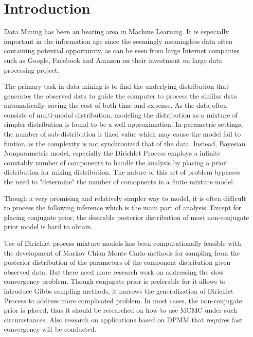 \section{Introduction}
\indent Data Mining has been an heating area in Machine Learning. It is especially important in the information age since the seemingly meaningless data often containing potential opportunity, as can be seen from large Internet companies such as Google, Facebook and Amazon \cite{mcafee2012big}on their investment on large data processing project. 

The primary task in data mining is to find the underlying distribution that generates the observed data to guide the computer to process the similar data automatically, saving the cost of both time and expense. As the data often consists of multi-modal distribution, modeling the distribution as a mixture of simpler distribution is found to be a well approximation. In parametric settings, the number of sub-distribution is fixed value which may cause the model fail to funtion as the complexity is not synchronized that of the data. Instead, Bayesian Nonparametric model, especially the Dirichlet Process employs a infinite countably number of components to handle the analysis by placing a prior distribution for mixing distribution. The nature of this set of problem bypasses the need to "determine" the number of comopnents in a finite mixture model. 

Though a very promising and relatively simpler way to model, it is often difficult to process the following inference which is the main part of analysis. Except for placing conjugate prior, the desirable posterior distribution of most non-conjugate prior model is hard to obtain. 

Use of Dirichlet process mixture models has been computationally feasible with the development of Markov Chian Monte Carlo methods for sampling from the posterior distribution of the parameters of the component distritution given observed data. But there need more research work on addressing the slow convergency problem. Though conjugate prior is preferable for it allows to introduce Gibbs sampling methods, it narrows the generalization of Dirichlet Process to address more complicated problem. In most cases, the non-conjugate prior is placed, thus it should be researched on how to use MCMC under such circumstances. Also research on applications based on DPMM that requires fast convergency will be conducted.

 



